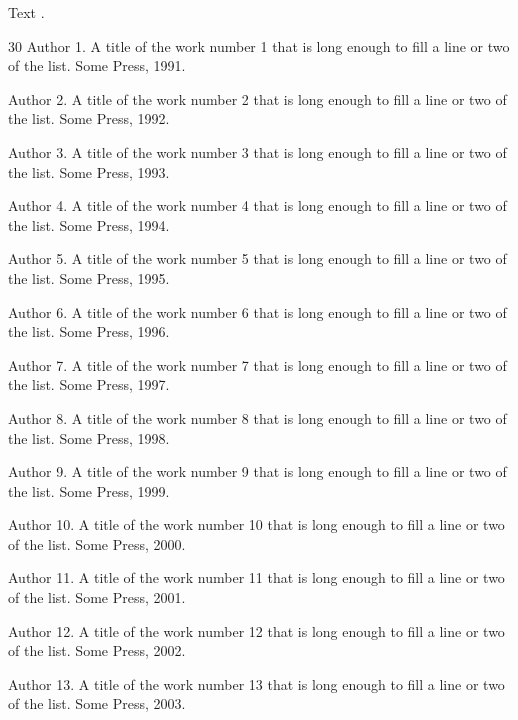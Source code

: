 \documentclass{report}
\begin{document}
Text \citep{k1}.

\begin{thebibliography}{30}
Author 1.
\newblock A title of the work number 1 that is long enough to fill a line or two of the list.
\newblock Some Press, 1991.

Author 2.
\newblock A title of the work number 2 that is long enough to fill a line or two of the list.
\newblock Some Press, 1992.

Author 3.
\newblock A title of the work number 3 that is long enough to fill a line or two of the list.
\newblock Some Press, 1993.

Author 4.
\newblock A title of the work number 4 that is long enough to fill a line or two of the list.
\newblock Some Press, 1994.

Author 5.
\newblock A title of the work number 5 that is long enough to fill a line or two of the list.
\newblock Some Press, 1995.

Author 6.
\newblock A title of the work number 6 that is long enough to fill a line or two of the list.
\newblock Some Press, 1996.

Author 7.
\newblock A title of the work number 7 that is long enough to fill a line or two of the list.
\newblock Some Press, 1997.

Author 8.
\newblock A title of the work number 8 that is long enough to fill a line or two of the list.
\newblock Some Press, 1998.

Author 9.
\newblock A title of the work number 9 that is long enough to fill a line or two of the list.
\newblock Some Press, 1999.

Author 10.
\newblock A title of the work number 10 that is long enough to fill a line or two of the list.
\newblock Some Press, 2000.

Author 11.
\newblock A title of the work number 11 that is long enough to fill a line or two of the list.
\newblock Some Press, 2001.

Author 12.
\newblock A title of the work number 12 that is long enough to fill a line or two of the list.
\newblock Some Press, 2002.

Author 13.
\newblock A title of the work number 13 that is long enough to fill a line or two of the list.
\newblock Some Press, 2003.


\end{thebibliography}
\end{document}
